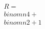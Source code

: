 \documentclass[preview]{standalone}
\begin{document}
\begin{align*}
R = \\binom{n}{4} + \\binom{n}{2} + 1
\end{align*}
\end{document}
